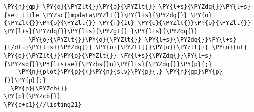 \begin{Verbatim}[commandchars=\\\{\}]
    \PY{n}{gp} \PY{o}{\PYZlt{}}\PY{o}{\PYZlt{}} \PY{l+s}{\PYZdq{}}\PY{l+s}{set title \PYZsq{}mpdata\PYZlt{}}\PY{l+s}{\PYZdq{}} \PY{o}{\PYZlt{}}\PY{o}{\PYZlt{}} \PY{n}{it} \PY{o}{\PYZlt{}}\PY{o}{\PYZlt{}} \PY{l+s}{\PYZdq{}}\PY{l+s}{\PYZgt{} }\PY{l+s}{\PYZdq{}}
       \PY{o}{\PYZlt{}}\PY{o}{\PYZlt{}} \PY{l+s}{\PYZdq{}}\PY{l+s}{t/dt=}\PY{l+s}{\PYZdq{}} \PY{o}{\PYZlt{}}\PY{o}{\PYZlt{}} \PY{n}{nt} \PY{o}{\PYZlt{}}\PY{o}{\PYZlt{}} \PY{l+s}{\PYZdq{}}\PY{l+s}{\PYZsq{}}\PY{l+s+se}{\PYZbs{}n}\PY{l+s}{\PYZdq{}}\PY{p}{;}
    \PY{n}{plot}\PY{p}{(}\PY{n}{slv}\PY{p}{,} \PY{n}{gp}\PY{p}{)}\PY{p}{;}
  \PY{p}{\PYZcb{}}
\PY{p}{\PYZcb{}}
\PY{c+c1}{//listing21}
\end{Verbatim}
